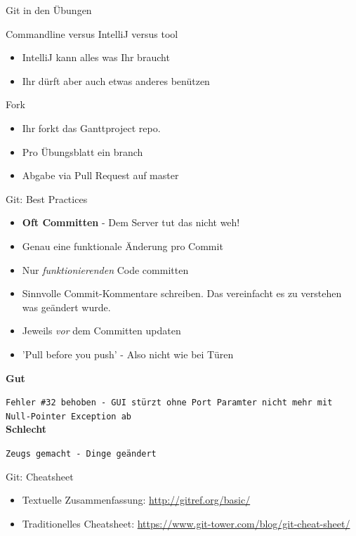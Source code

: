 \documentclass{beamer}
\begin{document}
\begin{frame}{Git in den Übungen}
	\begin{block}{Commandline versus IntelliJ versus tool}
		\begin{itemize}
			\item IntelliJ kann alles was Ihr braucht
			\item Ihr dürft aber auch etwas anderes benützen
		\end{itemize}
	\end{block}
	\begin{block}{Fork}
		\begin{itemize}
			\item Ihr forkt das Ganttproject repo.
			\item Pro Übungsblatt ein branch
			\item Abgabe via Pull Request auf master
		\end{itemize}
	\end{block}
\end{frame}


\begin{frame}{Git: Best Practices}
	\begin{itemize}
		\item \textbf{Oft Committen} - Dem Server tut das nicht weh!
		\item Genau eine funktionale Änderung pro Commit
		\item Nur \emph{funktionierenden} Code committen
		\item Sinnvolle Commit-Kommentare schreiben. Das vereinfacht es zu verstehen was geändert wurde.
		\item Jeweils \emph{vor} dem Committen updaten
		\item 'Pull before you push' - Also nicht wie bei Türen
	\end{itemize}
	\textbf{Gut}
	
	\texttt{Fehler \#32 behoben - GUI stürzt ohne Port Paramter nicht mehr mit Null-Pointer Exception ab}\\[1.5em]
	\textbf{Schlecht} 
	
	\texttt{Zeugs gemacht - Dinge geändert}
\end{frame}

\begin{frame}{Git: Cheatsheet}
	\begin{itemize}
		\item Textuelle Zusammenfassung: \url{http://gitref.org/basic/}
		\item Traditionelles Cheatsheet: \url{https://www.git-tower.com/blog/git-cheat-sheet/}
	\end{itemize}
\end{frame}
\begin{frame}[t,plain]
\end{frame}
\end{document}
